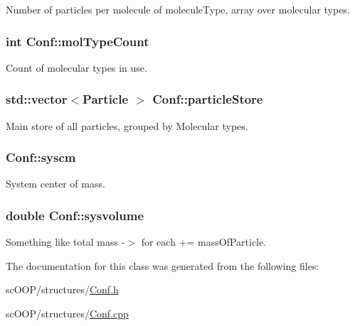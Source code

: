 Number of particles per molecule of molecule\+Type, array over molecular types. 

\hypertarget{class_conf_a0eea95a1c34f8ace0939fd75eb7fe55f}{
\subsubsection[{mol\+Type\+Count}]{\setlength{\rightskip}{0pt plus 5cm}int Conf\+::mol\+Type\+Count}}\label{class_conf_a0eea95a1c34f8ace0939fd75eb7fe55f}


Count of molecular types in use. 

\hypertarget{class_conf_a338d1f9d722924ef7bdf230cec6d8713}{
\subsubsection[{particle\+Store}]{\setlength{\rightskip}{0pt plus 5cm}std\+::vector$<${\bf Particle} $>$ Conf\+::particle\+Store}}\label{class_conf_a338d1f9d722924ef7bdf230cec6d8713}


Main store of all particles, grouped by Molecular types. 

\hypertarget{class_conf_a8d27bcc5bf535c39c7c0f17a078448d9}{
\subsubsection[{syscm}]{ Conf\+::syscm}}\label{class_conf_a8d27bcc5bf535c39c7c0f17a078448d9}


System center of mass. 

\hypertarget{class_conf_a0591e720e4f06449a7d37a8e3135ddb1}{
\subsubsection[{sysvolume}]{\setlength{\rightskip}{0pt plus 5cm}double Conf\+::sysvolume}}\label{class_conf_a0591e720e4f06449a7d37a8e3135ddb1}


Something like total mass -\/$>$ for each += mass\+Of\+Particle. 



The documentation for this class was generated from the following files\+:\begin{DoxyCompactItemize}
\item 
sc\+O\+O\+P/structures/\hyperlink{_conf_8h}{Conf.\+h}\item 
sc\+O\+O\+P/structures/\hyperlink{_conf_8cpp}{Conf.\+cpp}\end{DoxyCompactItemize}
